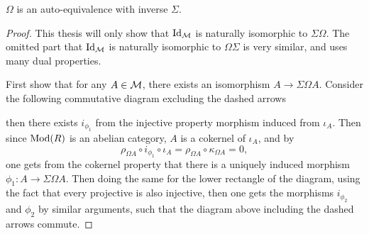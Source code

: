\begin{theorem}
    \( \Omega \) is an auto-equivalence with inverse \( \Sigma \).
\end{theorem}
\begin{proof}
    This thesis will only show that \( \operatorname{Id}_{{\mathcal{M}}} \) is naturally isomorphic to \( \Sigma\Omega \). The omitted part that \( \operatorname{Id}_{{\mathcal{M}}} \) is naturally isomorphic to \( \Omega\Sigma \) is very similar, and uses many dual properties.

    First show that for any \( A \in {\mathcal{M}} \), there exists an isomorphism \( A \to \Sigma\Omega A \). Consider the following commutative diagram excluding the dashed arrows
    \begin{center}
    \end{center}
    then there exists \( i_{\phi_1} \) from the injective property morphism induced from \( \iota_A \). Then since \( \operatorname{Mod}(R) \) is an abelian category, \( A \) is a cokernel of \( \iota_A \), and by
    \[
        \rho_{\Omega A} \circ i_{\phi_1} \circ \iota_A = \rho_{\Omega A} \circ \kappa_{\Omega A} = 0,
    \]
    one gets from the cokernel property that there is a uniquely induced morphism \( \phi_1: A \to \Sigma\Omega A \). Then doing the same for the lower rectangle of the diagram, using the fact that every projective is also injective, then one gets the morphisms \( i_{\phi_2} \) and \( \phi_2 \) by similar arguments, such that the diagram above including the dashed arrows commute.


\end{proof}
